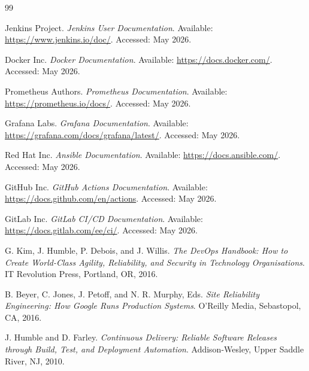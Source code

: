 \documentclass[12pt,a4paper]{report}
\begin{document}

\begin{thebibliography}{99}

Jenkins Project.
\textit{Jenkins User Documentation}.
Available: \url{https://www.jenkins.io/doc/}.
Accessed: May 2026.

Docker Inc.
\textit{Docker Documentation}.
Available: \url{https://docs.docker.com/}.
Accessed: May 2026.

Prometheus Authors.
\textit{Prometheus Documentation}.
Available: \url{https://prometheus.io/docs/}.
Accessed: May 2026.

Grafana Labs.
\textit{Grafana Documentation}.
Available: \url{https://grafana.com/docs/grafana/latest/}.
Accessed: May 2026.

Red Hat Inc.
\textit{Ansible Documentation}.
Available: \url{https://docs.ansible.com/}.
Accessed: May 2026.

GitHub Inc.
\textit{GitHub Actions Documentation}.
Available: \url{https://docs.github.com/en/actions}.
Accessed: May 2026.

GitLab Inc.
\textit{GitLab CI/CD Documentation}.
Available: \url{https://docs.gitlab.com/ee/ci/}.
Accessed: May 2026.

G. Kim, J. Humble, P. Debois, and J. Willis.
\textit{The DevOps Handbook: How to Create World-Class Agility, Reliability, and Security in Technology Organisations}.
IT Revolution Press, Portland, OR, 2016.

B. Beyer, C. Jones, J. Petoff, and N. R. Murphy, Eds.
\textit{Site Reliability Engineering: How Google Runs Production Systems}.
O'Reilly Media, Sebastopol, CA, 2016.

J. Humble and D. Farley.
\textit{Continuous Delivery: Reliable Software Releases through Build, Test, and Deployment Automation}.
Addison-Wesley, Upper Saddle River, NJ, 2010.

\end{thebibliography}
\end{document}
